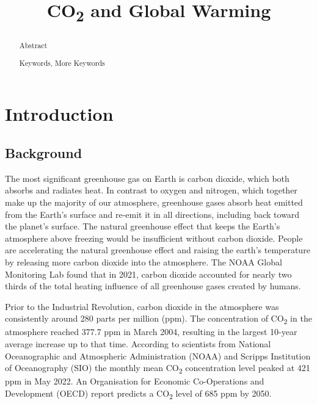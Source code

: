 \documentclass{mcmthesis}
\title{CO\textsubscript{2} and Global Warming}
\begin{document}
    \begin{abstract}
        Abstract

        \begin{keywords}
            Keywords, More Keywords
        \end{keywords}

    \end{abstract}

    \maketitle
    \tableofcontents
    \newpage


    \section{Introduction}

    \subsection{Background}
    The most significant greenhouse gas on Earth is carbon dioxide, which both absorbs and radiates heat. In contrast to oxygen and nitrogen, which together make up the majority of our atmosphere, greenhouse gases absorb heat emitted from the Earth's surface and re-emit it in all directions, including back toward the planet's surface. The natural greenhouse effect that keeps the Earth's atmosphere above freezing would be insufficient without carbon dioxide. People are accelerating the natural greenhouse effect and raising the earth's temperature by releasing more carbon dioxide into the atmosphere. The NOAA Global Monitoring Lab found that in 2021, carbon dioxide accounted for nearly two thirds of the total heating influence of all greenhouse gases created by humans.

    Prior to the Industrial Revolution, carbon dioxide in the atmosphere was consistently around 280 parts per million (ppm).
    The concentration of CO\textsubscript{2} in the atmosphere reached 377.7 ppm
    in March 2004, resulting in the largest 10-year average
    increase up to that time. According to scientists from National
    Oceanographic and Atmospheric Administration (NOAA) and
    Scripps Institution of Oceanography (SIO) the monthly mean
    CO\textsubscript{2} concentration level peaked at 421 ppm in May 2022. An
    Organisation for Economic Co-Operations and Development
    (OECD) report predicts a CO\textsubscript{2} level of 685 ppm by 2050.
\end{document}
